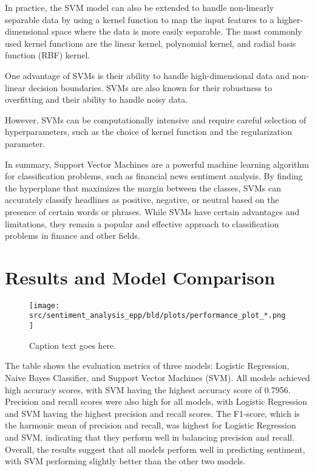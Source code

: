 \documentclass{article}
\begin{document}
In practice, the SVM model can also be extended to handle non-linearly separable data by using a kernel function to map the input features to a higher-dimensional space where the data is more easily separable. The most commonly used kernel functions are the linear kernel, polynomial kernel, and radial basis function (RBF) kernel.

One advantage of SVMs is their ability to handle high-dimensional data and non-linear decision boundaries. SVMs are also known for their robustness to overfitting and their ability to handle noisy data.

However, SVMs can be computationally intensive and require careful selection of hyperparameters, such as the choice of kernel function and the regularization parameter.

In summary, Support Vector Machines are a powerful machine learning algorithm for classification problems, such as financial news sentiment analysis. By finding the hyperplane that maximizes the margin between the classes, SVMs can accurately classify headlines as positive, negative, or neutral based on the presence of certain words or phrases. While SVMs have certain advantages and limitations, they remain a popular and effective approach to classification problems in finance and other fields.
\section{Results and Model Comparison}

\begin{figure}[htbp]
  \centering
  \texttt{[image: src/sentiment\_analysis\_epp/bld/plots/performance\_plot\_*.png]}
  \caption{Caption text goes here.}
  \label{fig:performance}
\end{figure}

The table shows the evaluation metrics of three models: Logistic Regression, Naive Bayes Classifier, and Support Vector Machines (SVM). All models achieved high accuracy scores, with SVM having the highest accuracy score of 0.7956. Precision and recall scores were also high for all models, with Logistic Regression and SVM having the highest precision and recall scores. The F1-score, which is the harmonic mean of precision and recall, was highest for Logistic Regression and SVM, indicating that they perform well in balancing precision and recall. Overall, the results suggest that all models perform well in predicting sentiment, with SVM performing slightly better than the other two models.
\\
\end{document}
